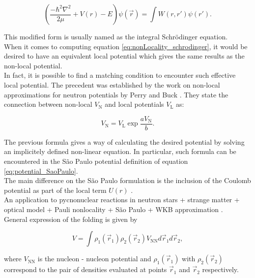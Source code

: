 \documentclass[openany]{book}
\begin{document}
\begin{equation} \label{eq:nonLocality_schrodinger}
	\left(\frac{-\hbar^2 \nabla^2}{2\mu} + V(r)  - E  \right) \psi(\vec r) =   \int W(r, r') \psi(r').
\end{equation}

This modified form is usually named as the integral Schrödinger equation. \\

When it comes to computing equation \ref{eq:nonLocality_schrodinger}, it would be desired to have an equivalent local potential which gives the same results as the non-local potential. \\

In fact, it is possible to find a matching condition to encounter such effective local potential. The precedent was established by the work on non-local approximations for neutron potentials by Perry and Buck \cite{perey_buck_1962}. They state the connection between non-local $V_{\mathrm{N}}$ and local potentials $V_{\mathrm{L}}$ as:

\begin{equation}\label{eq:nonLocality_connection}
	V_{\mathrm{N}} = V_{\mathrm{L}} \exp{\frac{a V_{\mathrm{N}}}{b}}.
\end{equation}

The previous formula gives a way of calculating the desired potential by solving an implicitely defined non-linear equation. In particular, such formula can be encountered in the São Paulo potential definition of equation \ref{eq:potential_SaoPaulo}. \\

The main difference on the São Paulo formulation is the inclusion of the Coulomb potential as part of the local term $U(r)$ . \\

An application to pycnonuclear reactions in neutron stars + strange matter + optical model + Pauli nonlocality + São Paulo  + WKB approximation \cite{golf_hellmers_weber_2009}.\\ 


General expression of the folding is given by

\begin{equation}\label{potential_nonLocal_folding}
	V = \int \rho_1(\vec r_1) \rho_2(\vec r_2) V_\mathrm{NN} d\vec r_1 d\vec r_2,
\end{equation}

where $V_\mathrm{NN}$ is the nucleon - nucleon potential and $\rho_1(\vec r_1)$ with  $\rho_2(\vec r_2)$ correspond to the pair of densities evaluated at points $\vec r_1$ and $\vec r_2$ respectively. \\
\end{document}
